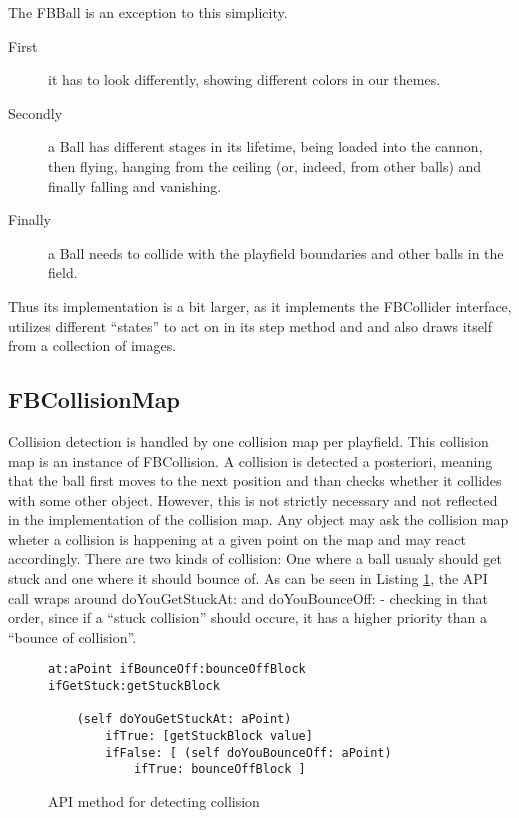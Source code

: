 The FBBall is an exception to this simplicity. 
\begin{description}
  \item[First]
    	it has to look 
	differently, showing different colors in our themes. 
  \item[Secondly]
    	a Ball has different stages in its lifetime, being 
	loaded into the cannon, then flying, hanging from the 
	ceiling (or, indeed, from other balls) and finally falling 
	and vanishing.
  \item[Finally]
    	a Ball needs to collide with the playfield boundaries and 
	other balls in the field.
\end{description}
Thus its implementation is a bit larger, as it implements the FBCollider 
interface, utilizes different ``states'' to act on in its step method and 
and also draws itself from a collection of images.
%
\subsection{FBCollisionMap}
Collision detection is handled by one collision map per playfield. This collision
map is an instance of FBCollision. A collision is detected a posteriori, meaning
that the ball first moves to the next position and  than checks whether it collides
with some other object. However, this is not strictly necessary and not reflected in
the implementation of the collision map. Any object may ask the collision map wheter
a collision is happening at a given point on the map and may react accordingly. There
are two kinds of collision: One where a ball usualy should get stuck and one where it
should bounce of. As can be seen in Listing \ref{lst:ifBounceOff}, the API call wraps
around doYouGetStuckAt: and doYouBounceOff: - checking in that order, since if a ``stuck
collision'' should occure, it has a higher priority than a ``bounce of collision''.

\begin{figure}
  \begin{center}
    \begin{lstlisting}
at:aPoint ifBounceOff:bounceOffBlock ifGetStuck:getStuckBlock
	
	(self doYouGetStuckAt: aPoint)
		ifTrue: [getStuckBlock value]
		ifFalse: [ (self doYouBounceOff: aPoint)
			ifTrue: bounceOffBlock ]
    \end{lstlisting}
  \end{center}
  \caption{API method for detecting collision}
  \label{lst:ifBounceOff}
\end{figure}
%
